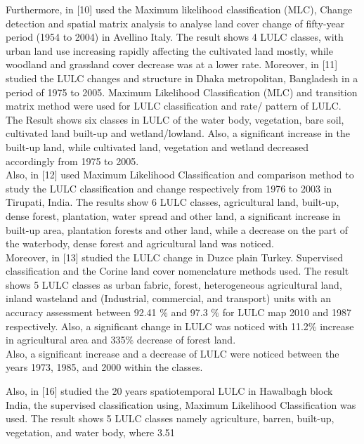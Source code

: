\documentclass[12pt,a4paper]{article}
\begin{document}
	Furthermore, in [10] used the Maximum likelihood classification	(MLC), Change detection and spatial matrix analysis to analyse	land cover change of fifty-year period (1954 to 2004) in Avellino 	Italy. The result shows 4 LULC classes, with urban land use increasing rapidly affecting the cultivated land mostly, while woodland and grassland cover decrease was at a lower rate.	Moreover, in [11] studied the LULC changes and structure in	Dhaka metropolitan, Bangladesh in a period of 1975 to 2005.	Maximum Likelihood Classification (MLC) and transition matrix	method were used for LULC classification and rate/ pattern of	LULC. The Result shows six classes in LULC of the water body,
	vegetation, bare soil, cultivated land built-up and wetland/lowland.	Also, a significant increase in the built-up land, while cultivated	land, vegetation and wetland decreased accordingly from 1975 to	2005.\\
	
	Also, in [12] used Maximum Likelihood Classification and comparison method to study the LULC classification and change respectively from 1976 to 2003 in Tirupati, India. The results show	6 LULC classes, agricultural land, built-up, dense forest, plantation, water spread and other land, a significant increase in built-up	area, plantation forests and other land, while a decrease on the part	of the waterbody, dense forest and agricultural land was noticed.\\
	
	Moreover, in [13] studied the LULC change in Duzce plain Turkey. Supervised classification and the Corine land cover nomenclature methods used. The result shows 5 LULC classes as urban	fabric, forest, heterogeneous agricultural land, inland wasteland	and (Industrial, commercial, and transport) units with an accuracy	assessment between 92.41 $\%$ and 97.3 $\%$ for LULC map 2010 and
	1987 respectively. Also, a significant change in LULC was noticed with 11.2$\%$ increase in agricultural area and 335$\%$ decrease	of forest land.\\
	

	
	Also, a significant increase and a decrease of LULC were noticed between the years 1973, 1985, and 2000 within the classes.
	
	Also, in [16] studied the 20 years spatiotemporal LULC in Hawalbagh block India, the supervised classification using, Maximum	Likelihood Classification was used. The result shows 5 LULC	classes namely agriculture, barren, built-up, vegetation, and water	body, where 3.51%
	
\end{document}
